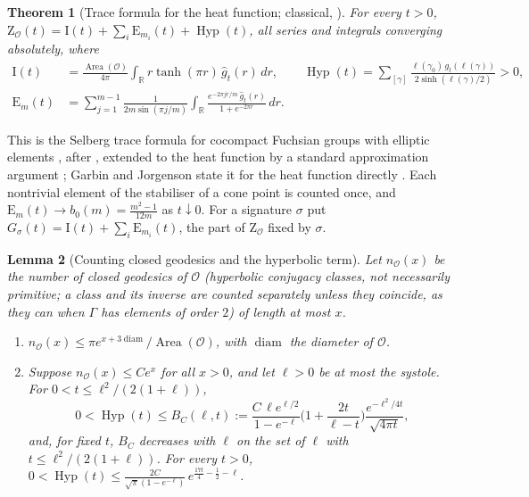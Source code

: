 \documentclass[pdflatex,sn-mathphys-num]{sn-jnl}
\theoremstyle{thmstyleone}%
\newtheorem{theorem}{Theorem}[section]%
\newtheorem{lemma}[theorem]{Lemma}%
\theoremstyle{thmstylethree}%
\newcommand{\Orb}{\mathcal{O}}
\newcommand{\Area}{\operatorname{Area}}
\newcommand{\Hyp}{\operatorname{Hyp}}
\newcommand{\diam}{\operatorname{diam}}
\newcommand{\R}{\mathbb{R}}
\newcommand{\cZ}{\mathrm{Z}}
\begin{document}
\begin{theorem}[Trace formula for the heat function; classical, {\cite[Thm~\ref*{A-thm:IEH}]{companionA}}]\label{thm:trace}
For every $t>0$, $\cZ_\Orb(t)=\mathrm I(t)+\sum_i\mathrm E_{m_i}(t)+\Hyp(t)$, all series and integrals converging absolutely, where
\begin{align*}
  \mathrm I(t)&=\frac{\Area(\Orb)}{4\pi}\int_\R r\tanh(\pi r)\,\hat g_t(r)\,dr,\qquad
  \Hyp(t)=\sum_{[\gamma]}\frac{\ell(\gamma_0)\,g_t(\ell(\gamma))}{2\sinh(\ell(\gamma)/2)}>0,\\
  \mathrm E_m(t)&=\sum_{j=1}^{m-1}\frac1{2m\sin(\pi j/m)}\int_\R\frac{e^{-2\pi jr/m}\,\hat g_t(r)}{1+e^{-2\pi r}}\,dr .
\end{align*}
\end{theorem}

This is the Selberg trace formula for cocompact Fuchsian groups with elliptic elements \cite[eq.~(1)]{drydenstrohmaier2009}, after \cite{hejhal1976,iwaniec2002}, extended to the heat function by a standard approximation argument \cite[Lemma~\ref*{A-lem:admissible}]{companionA}; Garbin and Jorgenson state it for the heat function directly \cite[Rem.~2.7, (2.8)]{garbinjorgenson2020}. Each nontrivial element of the stabiliser of a cone point is counted once, and $\mathrm E_m(t)\to b_0(m)=\frac{m^2-1}{12m}$ as $t\downarrow0$. For a signature $\sigma$ put $G_\sigma(t)=\mathrm I(t)+\sum_i\mathrm E_{m_i}(t)$, the part of $\cZ_\Orb$ fixed by $\sigma$.

\begin{lemma}[Counting closed geodesics and the hyperbolic term]\label{lem:counting}\label{lem:hyp}
Let $n_\Orb(x)$ be the number of closed geodesics of $\Orb$ (hyperbolic conjugacy classes, not necessarily primitive; a class and its inverse are counted separately unless they coincide, as they can when $\Gamma$ has elements of order $2$) of length at most $x$.
\begin{enumerate}[label=(\roman*)]
\item $n_\Orb(x)\le\pi e^{x+3\diam}/\Area(\Orb)$, with $\diam$ the diameter of $\Orb$.
\item Suppose $n_\Orb(x)\le Ce^x$ for all $x>0$, and let $\ell>0$ be at most the systole. For $0<t\le\ell^2/(2(1+\ell))$,
\[
  0<\Hyp(t)\le B_C(\ell,t):=\frac{C\,\ell e^{\ell/2}}{1-e^{-\ell}}\Big(1+\frac{2t}{\ell-t}\Big)\frac{e^{-\ell^2/4t}}{\sqrt{4\pi t}},
\]
and, for fixed $t$, $B_C$ decreases with $\ell$ on the set of $\ell$ with $t\le\ell^2/(2(1+\ell))$. For every $t>0$, $0<\Hyp(t)\le\frac{2C}{\sqrt\pi(1-e^{-\ell})}\,e^{\frac{17t}4-\frac12-\ell}$.
\end{enumerate}
\end{lemma}
\end{document}

